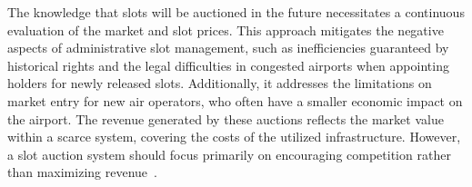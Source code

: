 The knowledge that slots will be auctioned in the future necessitates a 
continuous evaluation of the market and slot prices. This approach mitigates 
the negative aspects of administrative slot management, such as inefficiencies 
guaranteed by historical rights and the legal difficulties in congested 
airports when appointing holders for newly released slots. Additionally, it 
addresses the limitations on market entry for new air operators, who often 
have a smaller economic impact on the airport. 
%
The revenue generated by these auctions reflects the market value within a 
scarce system, covering the costs of the utilized infrastructure. 
%
However, a slot auction system should focus primarily on encouraging 
competition rather than maximizing revenue~\cite{ball2006auctions}.





